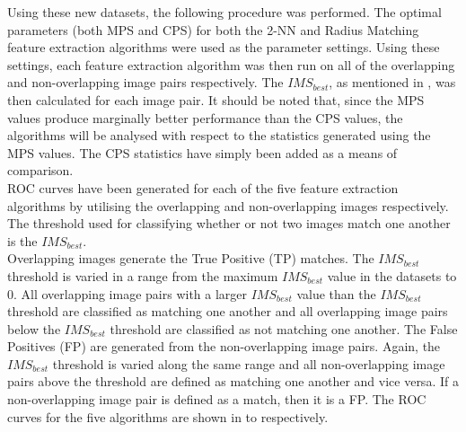 \documentclass{report}
\begin{document}
Using these new datasets, the following procedure was performed. The optimal parameters (both MPS and CPS) for both the 2-NN and Radius Matching feature extraction algorithms were used as the parameter settings. Using these settings, each feature extraction algorithm was then run on all of the overlapping and non-overlapping image pairs respectively. The $IMS_{best}$, as mentioned in , was then calculated for each image pair. It should be noted that, since the MPS values produce marginally better performance than the CPS values, the algorithms will be analysed with respect to the statistics generated using the MPS values. The CPS statistics have simply been added as a means of comparison. \\

ROC curves have been generated for each of the five feature extraction algorithms by utilising the overlapping and non-overlapping images respectively. The threshold used for classifying whether or not two images match one another is the $IMS_{best}$. \\

Overlapping images generate the True Positive (TP) matches. The $IMS_{best}$ threshold is varied in a range from the maximum $IMS_{best}$ value in the datasets to $0$.  All overlapping image pairs with a larger $IMS_{best}$ value than the $IMS_{best}$ threshold are classified as matching one another and all overlapping image pairs below the $IMS_{best}$ threshold are classified as not matching one another. The False Positives (FP) are generated from the non-overlapping image pairs. Again, the $IMS_{best}$ threshold is varied along the same range and all non-overlapping image pairs above the threshold are defined as matching one another and vice versa. If a non-overlapping image pair is defined as a match, then it is a FP. The ROC curves for the five algorithms are shown in  to  respectively.\\
\end{document}
